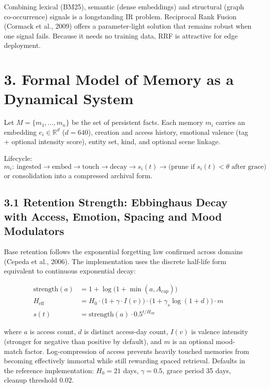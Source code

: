 \documentclass[]{article}
\begin{document}
Combining lexical (BM25), semantic (dense embeddings) and structural
(graph co-occurrence) signals is a longstanding IR problem. Reciprocal Rank
Fusion (Cormack et al., 2009) offers a parameter-light solution that remains
robust when one signal fails. Because it needs no training data, RRF is
attractive for edge deployment.

\hypertarget{formal-model-of-memory-as-a-dynamical-system}{%
\section{\texorpdfstring{\textbf{3. Formal Model of Memory as a
Dynamical
System}}{3. Formal Model of Memory as a Dynamical System}}\label{formal-model-of-memory-as-a-dynamical-system}}

Let \(M=\{m_1,\ldots,m_n\}\) be the set of persistent facts. Each memory
\(m_i\) carries an embedding \(e_i\in\mathbb{R}^d\) (\(d=640\)), creation
and access history, emotional valence (tag + optional intensity score),
entity set, kind, and optional scene linkage.

Lifecycle:
\[
m_i:\ \text{ingested}\to\text{embed}\to\text{touch}\to\text{decay}\to
s_i(t)\to\text{(prune if }s_i(t)<\theta\text{ after grace)}
\]
or consolidation into a compressed archival form.

\hypertarget{retention-strength}{%
\subsection{\texorpdfstring{\textbf{3.1 Retention Strength: Ebbinghaus
Decay with Access, Emotion, Spacing and Mood
Modulators}}{3.1 Retention Strength: Ebbinghaus Decay with Access, Emotion, Spacing and Mood Modulators}}\label{retention-strength}}

Base retention follows the exponential forgetting law confirmed across
domains (Cepeda et al., 2006). The implementation uses the discrete
half-life form equivalent to continuous exponential decay:

\begin{align*}
\text{strength}(a) &= 1 + \log\bigl(1+\min(a,A_{\text{cap}})\bigr) \\
H_{\text{eff}} &= H_0\cdot\bigl(1+\gamma\cdot I(v)\bigr)
\cdot\bigl(1+\gamma_s\log(1+d)\bigr)\cdot m \\
s(t) &= \text{strength}(a)\cdot 0.5^{t/H_{\text{eff}}}
\end{align*}

where \(a\) is access count, \(d\) is distinct access-day count, \(I(v)\)
is valence intensity (stronger for negative than positive by default),
and \(m\) is an optional mood-match factor. Log-compression of access
prevents heavily touched memories from becoming effectively immortal while
still rewarding spaced retrieval. Defaults in the reference implementation:
\(H_0=21\) days, \(\gamma=0.5\), grace period 35 days, cleanup threshold
\(0.02\).
\end{document}
